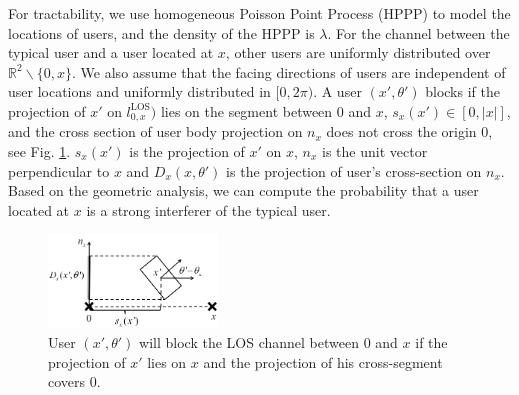 \documentclass[10pt, conference, letterpaper]{IEEEtran}
\begin{document}
For tractability, we use homogeneous Poisson Point Process (HPPP) to model the locations of users, and the density of the HPPP is $\lambda$. For the channel between the typical user and a user located at $x$, other users are uniformly distributed over $\mathbb{R}^2\backslash \{0,x\}$. We also assume that the facing directions of users are independent of user locations and uniformly distributed in $[0, 2\pi)$. A user $(x', \theta')$ blocks  if the projection of $x'$ on $l_{0,x}^{\mathrm{LOS}}\big)$ lies on the segment between $0$ and $x$, $s_x(x')\in [0,|x|]$, and the cross section of user body projection on $n_x$ does not cross the origin $0$, see Fig. \ref{fig:Channel_enb}. $s_x(x')$ is the projection of $x'$ on $x$, $n_x$ is the unit vector perpendicular to $x$ and $D_x(x, \theta')$ is the projection of user's cross-section on $n_x$. Based on the geometric analysis, we can compute the probability that a user located at $x$ is a strong interferer of the typical user. 

\begin{figure}
	\centering
	\includegraphics[width = 0.4\textwidth]{Channel_ENB.pdf}
	\caption{User $(x', \theta')$ will block the LOS channel between $0$ and $x$ if the projection of $x'$ lies on $x$ and the projection of his cross-segment covers $0$. }
	\label{fig:Channel_enb}
\end{figure}
\end{document}
